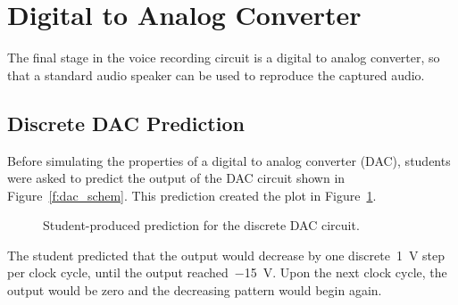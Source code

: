 \section{Digital to Analog Converter}
The final stage in the voice recording circuit is a digital to analog
converter, so that a standard audio speaker can be used to reproduce the
captured audio.
\subsection{Discrete DAC Prediction}
Before simulating the properties of a digital to analog converter (DAC),
students were asked to predict the output of the DAC circuit shown in
Figure~\ref{f:dac_schem}.  This prediction created the plot in
Figure~\ref{f:prediction}.
%
\begin{figure}[H]
\centering
	
	\parbox{.8\textwidth}{
	\caption[Discrete DAC --- Prediction]{Student-produced prediction for the discrete DAC circuit.}
	\label{f:prediction}}
\end{figure}
%
The student predicted that the output would decrease by one
discrete~\SI{1}{\volt} step per clock cycle, until the output
reached~\SI{-15}{\volt}.  Upon the next clock cycle, the output would be zero
and the decreasing pattern would begin again.


